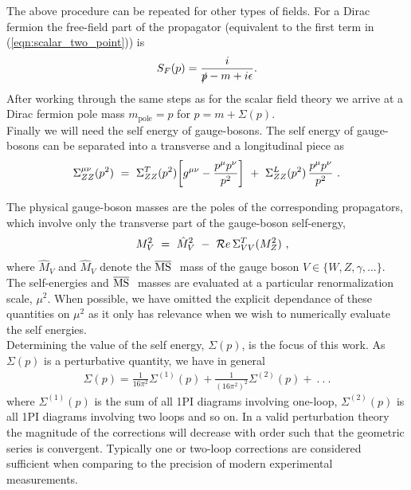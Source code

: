 \documentclass[11pt]{article}
\begin{document}
The above procedure can be repeated for other types of fields.  For a Dirac fermion the free-field part of the propagator (equivalent to the first term in (\ref{eqn:scalar_two_point})) is
\begin{align}
S_F(p) = \frac{i}{\slashed{p}-m+i\epsilon}.
\end{align}
After working through the same steps as for the scalar field theory we arrive at a Dirac fermion pole mass $m_{\text{pole}}=p$ for $p=m+\Sigma(p)$.\\

Finally we will need the self energy of gauge-bosons.  The self energy of gauge-bosons can be separated into a transverse and a longitudinal piece as
\begin{equation}
\Sigma^{\mu\nu}_{ZZ}(p^2) \ =\ \Sigma_{ZZ}^T(p^2)\biggl[g^{\mu\nu}
-{p^{\mu}p^{\nu}\over p^2}\biggr] \ +\ \Sigma_{ZZ}^L(p^2)\,
{p^{\mu}p^{\nu}\over p^2}\ .
\end{equation}

The physical gauge-boson masses are the poles of the corresponding
propagators, which involve only the transverse part of the gauge-boson
self-energy,
%
\begin{eqnarray}
&& M_V^2 \ =\ \hat M_V^2 \ -\ {\cal
R}e\,\Sigma^T_{VV}(M_Z^2)~,\label{mz}
\end{eqnarray}
%
where $\hat M_V$ and $\hat M_V$ denote the
\mbox{\footnotesize$\overline{\rm MS}~$} mass of the gauge boson $V\in\{W,Z,\gamma, ... \}$.\\

The self-energies and \mbox{\footnotesize$\overline{\rm MS}~$} masses are evaluated at a particular renormalization scale, $\mu^2$.  When possible, we have omitted the explicit dependance of these quantities on $\mu^2$ as it only has relevance when we wish to numerically evaluate the self energies.\\

Determining the value of the self energy, $\Sigma(p)$, is the focus of this work.  As $\Sigma(p)$ is a perturbative quantity, we have in general
\begin{align}
\Sigma(p) = \frac{1}{16\pi^2}\Sigma^{(1)}(p)+\frac{1}{\left(16\pi^2\right)^2}\Sigma^{(2)}(p)+\ . \ . \ .
\end{align}
where $\Sigma^{(1)}(p)$ is the sum of all 1PI diagrams involving one-loop, $\Sigma^{(2)}(p)$ is all 1PI diagrams involving two loops and so on.  In a valid perturbation theory the magnitude of the corrections will decrease with order such that the geometric series is convergent.  Typically one or two-loop corrections are considered sufficient when comparing to the precision of modern experimental measurements.\\
\end{document}
